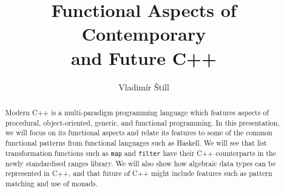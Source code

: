 \documentclass{lecture}
\title{Functional Aspects of Contemporary\\ and Future C++}
\subtitle{}
\author{Vladimír Štill}
\begin{document}
\maketitle

\begin{abstract}
	Modern C++ is a multi-paradigm programming language which features aspects
	of procedural, object-oriented, generic, and functional programming.
	In this presentation, we will focus on its functional aspects and relate its
	features to some of the common functional patterns from functional
	languages such as Haskell.
	We will see that list transformation functions such as \texttt{map} and
	\texttt{filter} have their C++ counterparts in the newly standardised ranges
	library.
	We will also show how algebraic data types can be represented in C++, and
	that future of C++ might include features such as pattern matching and use
	of monads.
\end{abstract}

\begin{frame}
    \frametitle{}
    \framesubtitle{}
\end{frame}
\end{document}
